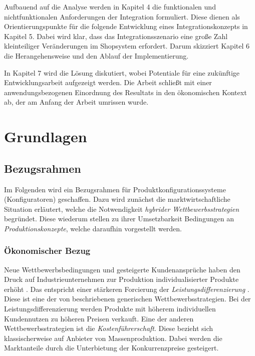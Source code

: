 \documentclass[11pt, a4paper, titlepage, listof=totoc, bibliography=totoc, index=totoc, twoside, openright, headings=normal]{scrreprt}
\begin{document}
Aufbauend auf die Analyse werden in Kapitel 4 die funktionalen und nichtfunktionalen Anforderungen der Integration formuliert. Diese dienen als Orientierungspunkte für die folgende Entwicklung eines Integrationskonzepts in Kapitel 5. Dabei wird klar, dass das Integrationsszenario eine große Zahl kleinteiliger Veränderungen im Shopsystem erfordert. Darum skizziert Kapitel 6 die Herangehensweise und den Ablauf der Implementierung.

In Kapitel 7 wird die Lösung diskutiert, wobei Potentiale für eine zukünftige Entwicklungsarbeit aufgezeigt werden. Die Arbeit schließt mit einer anwendungsbezogenen Einordnung des Resultats in den ökonomischen Kontext ab, der am Anfang der Arbeit umrissen wurde.


\pagebreak

\chapter{Grundlagen}

\section{Bezugsrahmen}
Im Folgenden wird ein Bezugsrahmen für Produktkonfigurationssysteme (Konfiguratoren) geschaffen. Dazu wird zunächst die marktwirtschaftliche Situation erläutert, welche die Notwendigkeit \emph{hybrider Wettbewerbsstrategien} begründet. Diese wiederum stellen zu ihrer Umsetzbarkeit Bedingungen an \emph{Produktionskonzepte}, welche daraufhin vorgestellt werden.

\subsection{Ökonomischer Bezug}
\label{oekonomischerBezug}
Neue Wettbewerbsbedingungen und gesteigerte Kundenansprüche haben den Druck auf Industrieunternehmen zur Produktion individualisierter Produkte erhöht \citep{piller98}. Das entspricht einer stärkeren Forcierung der \emph{Leistungsdifferenzierung} \citep{lutz11}. Diese ist eine der von \citet{porter02} beschriebenen \glqq generischen Wettbewerbsstrategien\grqq{}. Bei der Leistungsdifferenzierung werden Produkte mit höherem individuellen Kundennutzen zu höheren Preisen verkauft. Eine der anderen Wettbewerbsstrategien ist die \emph{Kostenführerschaft}. Diese bezieht sich klassischerweise auf Anbieter von Massenproduktion. Dabei werden die Marktanteile durch die Unterbietung der Konkurrenzpreise gesteigert.
\end{document}
